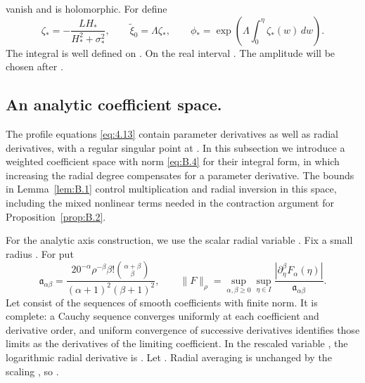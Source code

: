 %
vanish and  is holomorphic. For
 define
\begin{equation}
  \zeta_*=-\frac{LH_*}{H_*^2+\sigma_*^2},
  \qquad \widetilde\xi_0=\Lambda\zeta_*,
  \qquad \phi_*=\exp\!\left(\Lambda\int_0^\eta \zeta_*(w)\,dw\right).
  \tag{B.3}\label{eq:B.3}
\end{equation}
The integral is well defined on . On the real interval
. The amplitude  will be chosen after
.

\subsection{An analytic coefficient space.}\label{sec:B.2}
The profile equations \eqref{eq:4.13} contain parameter derivatives as well as radial derivatives,
with a regular singular point at . In this subsection we introduce a
weighted coefficient space  with norm \eqref{eq:B.4} for their
integral form, in which increasing the radial degree compensates for a parameter derivative. The
bounds in Lemma~\ref{lem:B.1} control multiplication and radial inversion in this space, including
the mixed nonlinear terms needed in the contraction argument for Proposition~\ref{prop:B.2}.

For the analytic axis construction, we use the scalar radial variable
. Fix a small radius . For
 put
\begin{equation}
  \mathfrak a_{\alpha\beta}
  =\frac{20^{-\alpha}\rho^{-\beta}\beta!\binom{\alpha+\beta}{\beta}}
         {(\alpha+1)^2(\beta+1)^2},
  \qquad
  \lVert F\rVert_\rho
  =\sup_{\alpha,\beta\geq0}\sup_{\eta\in I}
    \frac{|\partial_\eta^\beta F_\alpha(\eta)|}{\mathfrak a_{\alpha\beta}}.
  \tag{B.4}\label{eq:B.4}
\end{equation}
Let  consist of the sequences of smooth coefficients with
finite norm. It is complete: a Cauchy sequence converges uniformly at each coefficient and
derivative order, and uniform convergence of successive derivatives identifies those limits as
the derivatives of the limiting coefficient. In the rescaled variable ,
the logarithmic radial derivative is
. Let
. Radial averaging is unchanged by
the scaling , so
.

